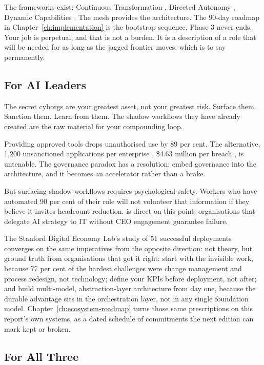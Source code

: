 The frameworks exist: Continuous Transformation \parencite{WadeBonnet2025}, Directed Autonomy \parencite{MicrosoftDirectedAutonomy2025}, Dynamic Capabilities \parencite{Teece2025}. The mesh provides the architecture. The 90-day roadmap in Chapter~\ref{ch:implementation} is the bootstrap sequence. Phase 3 never ends. Your job is perpetual, and that is not a burden. It is a description of a role that will be needed for as long as the jagged frontier moves, which is to say permanently.

\subsection{For AI Leaders}

The secret cyborgs are your greatest asset, not your greatest risk. Surface them. Sanction them. Learn from them. The shadow workflows they have already created are the raw material for your compounding loop.

Providing approved tools drops unauthorised use by 89 per cent. The alternative, 1,200 unsanctioned applications per enterprise \parencite{Gartner2025}, \$4.63 million per breach \parencite{IBM2025}, is untenable. The governance paradox has a resolution: embed governance into the architecture, and it becomes an accelerator rather than a brake.

But surfacing shadow workflows requires psychological safety. Workers who have automated 90 per cent of their role will not volunteer that information if they believe it invites headcount reduction. \textcite{Mollick2025Management} is direct on this point: organisations that delegate AI strategy to IT without CEO engagement guarantee failure.

The Stanford Digital Economy Lab's study of 51 successful deployments \parencite{Pereira2026Playbook} converges on the same imperatives from the opposite direction: not theory, but ground truth from organisations that got it right: start with the invisible work, because 77 per cent of the hardest challenges were change management and process redesign, not technology; define your KPIs before deployment, not after; and build multi-model, abstraction-layer architecture from day one, because the durable advantage sits in the orchestration layer, not in any single foundation model. Chapter~\ref{ch:ecosystem-roadmap} turns those same prescriptions on this report's own systems, as a dated schedule of commitments the next edition can mark kept or broken.

\subsection{For All Three}

